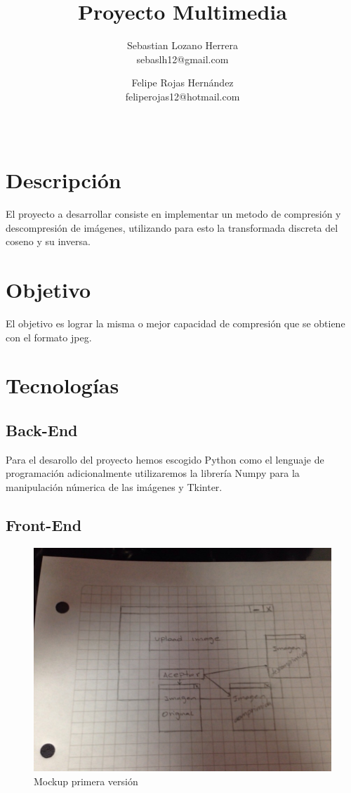 \documentclass{article}
\title{Proyecto Multimedia}
\author{Sebastian Lozano Herrera\\ sebaslh12@gmail.com \and Felipe Rojas Hernández\\ feliperojas12@hotmail.com}
\date{\ }
\begin{document}
\maketitle
\section{Descripción}
El proyecto a desarrollar consiste en implementar un metodo de compresión y
descompresión de imágenes, utilizando para esto la transformada discreta del coseno y su inversa.
\section{Objetivo}
El objetivo es lograr la misma o mejor capacidad de compresión que se obtiene con el formato jpeg.
\section{Tecnologías}
\subsection{Back-End}
Para el desarollo del proyecto hemos escogido Python como el lenguaje de programación adicionalmente utilizaremos la librería Numpy para la manipulación númerica de las imágenes y Tkinter.
\newpage
\subsection{Front-End}
\begin{figure}[h]
\centering
\includegraphics[width=\textwidth]{mockup}
\caption{Mockup primera versión}
\end{figure}
\end{document}
